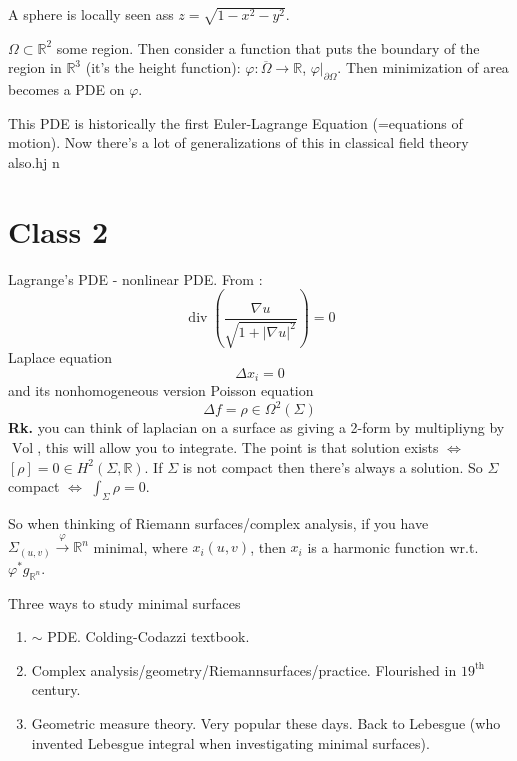 \begin{example}\leavevmode
A sphere is locally seen ass \(z=\sqrt{1-x^2-y^2} \).
\end{example}

\(\Omega \subset \mathbb{R}^2\) some region. Then consider a function that puts the boundary of the region in \(\mathbb{R}^3\) (it's the height function): \(\varphi: \overline{\Omega}\to \mathbb{R}\), \(\varphi|_{\partial\Omega}\). Then minimization of area becomes a PDE on \(\varphi\).

This PDE is historically the first Euler-Lagrange Equation (=equations of motion). Now there's a lot of generalizations of this in classical field theory also.hj n

\section{Class 2}

Lagrange's PDE - nonlinear PDE. From \cite{salsa}:
\[\operatorname{div}\left(\frac{\nabla u}{\sqrt{1+|\nabla u|^2} }\right) =0\]
Laplace equation 
\[\Delta x_i=0\]
and its nonhomogeneous version Poisson equation \[\Delta f=\rho \in \Omega^{2}(\Sigma)\]
\textbf{Rk.} you can think of laplacian on a surface as giving a 2-form by multipliyng by \(\operatorname{Vol}\), this will allow you to integrate. The point is that solution exists  \(\iff\) \([\rho] = 0 \in H^{2}(\Sigma,\mathbb{R})\). If \(\Sigma\) is not compact then there's always a solution. So  \(\Sigma\) compact \(\iff\) \(\int_\Sigma\rho=0\).

So when thinking of Riemann surfaces/complex analysis, if you have \(\Sigma_{(u,v)} \xrightarrow{\varphi}\mathbb{R}^n\) minimal, where \(x_i(u,v)\), then \(x_i\) is a harmonic function wr.t. \(\varphi^* g_{\mathbb{R}^n}\).

\begin{thing4}{Three ways to study minimal surfaces}\leavevmode
\begin{enumerate}
\item \(\sim\) PDE. Colding-Codazzi textbook.
\item Complex analysis/geometry/Riemannsurfaces/practice. Flourished in \(19^{\text{th} }\) century.
\item Geometric measure theory. Very popular these days. Back to Lebesgue (who invented Lebesgue integral when investigating minimal surfaces).
\end{enumerate}
\end{thing4}

